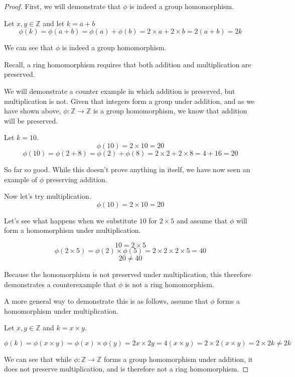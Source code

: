 \documentclass[a4paper]{article}
\begin{document}
\begin{myparindent}{0pt}
\begin{proof}
  First, we will demonstrate that $\phi$ is indeed a group homomorphism. \newline

  Let $x, y \in \mathbb{Z}$ and let $k = a + b$
  \[ \phi(k) = \phi(a + b) = \phi(a) + \phi(b) = 2 \times a + 2 \times b =
  2(a + b) = 2k
  \]

  We can see that $\phi$ is indeed a group homomorphism. \newline

  Recall, a ring homomorphism requires that both addition and multiplication
  are preserved. \newline

  We will demonstrate a counter example in which addition is preserved, but
  multiplication is not. Given that integers form a group under addition,
  and as we have shown above, $\phi: \mathbb{Z} \rightarrow \mathbb{Z}$ is a
  group homomorphism, we know that addition will be preserved. \newline

  Let $k = 10$.
  \[ \phi(10) = 2 \times 10 = 20 \]
  \[ \phi(10) = \phi(2 + 8) = \phi(2) + \phi(8) = 2 \times 2 + 2 \times 8 = 4 + 16 = 20 \]

  So far so good. While this doesn't prove anything in itself, we have now seen an
  example of $\phi$ preserving addition. \newline

  Now let's try multiplication.
  \[ \phi(10) = 2 \times 10 = 20 \]

  Let's see what happens when we substitute $10$ for $2 \times 5$ and assume that
  $\phi$ will form a homomorphism under multiplication.

  \[ 10 = 2 \times 5 \]
  \[ \phi(2 \times 5) = \phi(2) \times \phi(5) = 2 \times 2 \times 2 \times 5 = 40 \]
  \[ 20 \neq 40 \]

  Because the homomorphism is not preserved under multiplication, this therefore
  demonstrates a counterexample that $\phi$ is not a ring homomorphism.

  A more general way to demonstrate this is as follows, assume that $\phi$
  forms a homomorphism under multiplication. \newline

  Let $x, y \in \mathbb{Z}$ and $k = x \times y$.

  \[ \phi(k) = \phi(x \times y) = \phi(x) \times \phi(y) = 2x \times 2y = 4(x \times y) =
  2 \times 2(x \times y) = 2 \times 2k \neq 2k \]

  We can see that while $\phi: \mathbb{Z} \rightarrow \mathbb{Z}$ forms a group
  homomorphism under addition, it does not preserve multiplication, and is
  therefore not a ring homomorphism.

\end{proof}

\end{myparindent}
\end{document}
